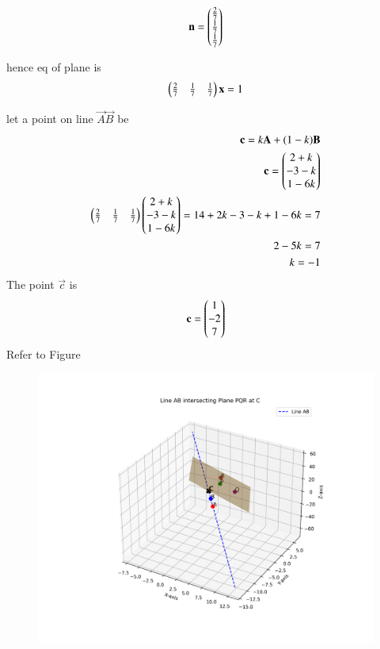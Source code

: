 \documentclass[journal]{IEEEtran}
\begin{document}
\begin{align}
\mathbf{n}=
\begin{pmatrix}\frac{2}{7}
       \\
       \frac{1}{7}
       \\
       \frac{1}{7}
\end{pmatrix}
\end{align}





hence eq of plane is
\begin{align}
 \begin{pmatrix}\tfrac{2}{7} & \tfrac{1}{7} & \tfrac{1}{7}\end{pmatrix} 
 \mathbf{x}
 =1
\end{align}   


let a point on line $\vec{A}\vec{B}$ be 
\begin{align}
\mathbf{c}=k\mathbf{A}+(1-k)\mathbf{B}\\
\mathbf{c}=\begin{pmatrix}2+k
               \\
              -3-k
              \\
              1-6k
 \end{pmatrix}\\
\begin{pmatrix}\tfrac{2}{7} & \tfrac{1}{7} & \tfrac{1}{7}\end{pmatrix} 
\begin{pmatrix}2+k
               \\
              -3-k
              \\
              1-6k
              \end{pmatrix}
 =1
 4+2k-3-k+1-6k=7\\
2-5k=7\\
k=-1
\end{align}
The point $\vec{c}$ is
\begin{align}
    \mathbf{c}=\begin{pmatrix}1
                   \\
                   -2
                   \\
                   7
             \end{pmatrix}
\end{align}
Refer to Figure

\begin{figure}[H]
\begin{center}
\includegraphics[width=0.6\columnwidth]{figs/graph8.png}
\end{center}
\caption{}
\label{fig:Fig}
\end{figure}
\end{document}
